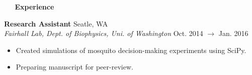 \documentclass[a4paper,12pt]{article}
\newcommand{\resheading}[1]{{\vspace*{.06in} \colorbox{mygrey}{\begin{minipage}{\textwidth}{\textmd{\large \textbf{#1} \vphantom{p\^{E}}}}\end{minipage}}} }
\newcommand{\ressubheading}[4]{
        \textbf{#1} \hfill #2\\
        \textit{#3} \hfill #4 \\}
\begin{document}
%
%    
%    
%    
\resheading{~\faBriefcase~ Experience}


\ressubheading{Research Assistant}{Seatle, WA}{Fairhall Lab, Dept. of Biophysics, Uni. of Washington}{Oct. 2014 $\rightarrow$ Jan. 2016}
\begin{itemize}[noitemsep,topsep=0pt,parsep=0pt,partopsep=0pt, nolistsep]
\item Created simulations of mosquito decision-making experiments using SciPy.
\item Preparing manuscript for peer-review.
\end{itemize}
 
\end{document}
